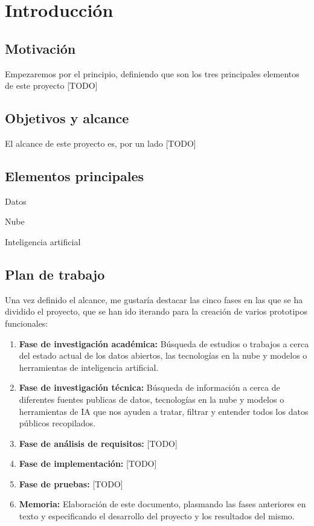 \chapter{Introducción}
\label{cap:introduccion}


\section{Motivación}

Empezaremos por el principio, definiendo que son los tres principales elementos de este proyecto [TODO]


\section{Objetivos y alcance}

El alcance de este proyecto es, por un lado [TODO]

\section{Elementos principales}

Datos

Nube

Inteligencia artificial

\section{Plan de trabajo}


Una vez definido el alcance, me gustaría destacar las cinco fases en las que se ha dividido el proyecto, que se han ido iterando para la creación de varios prototipos funcionales:


\begin{enumerate}
	
	\item \textbf{Fase de investigación académica:} Búsqueda de estudios o trabajos a cerca del estado actual de los datos abiertos, las tecnologías en la nube y modelos o herramientas de inteligencia artificial.
	
	\item \textbf{Fase de investigación técnica:} Búsqueda de información a cerca de diferentes fuentes publicas de datos,  tecnologías en la nube y modelos o herramientas de IA que nos ayuden a tratar, filtrar y entender todos los datos públicos recopilados.
	
	\item \textbf{Fase de análisis de requisitos:} [TODO]
	
	\item \textbf{Fase de implementación:} [TODO]
	
	\item \textbf{Fase de pruebas:} [TODO]
	
	\item \textbf{Memoria:} Elaboración de este documento, plasmando las fases anteriores en texto y especificando el desarrollo del proyecto y los resultados del mismo.
\end{enumerate}

